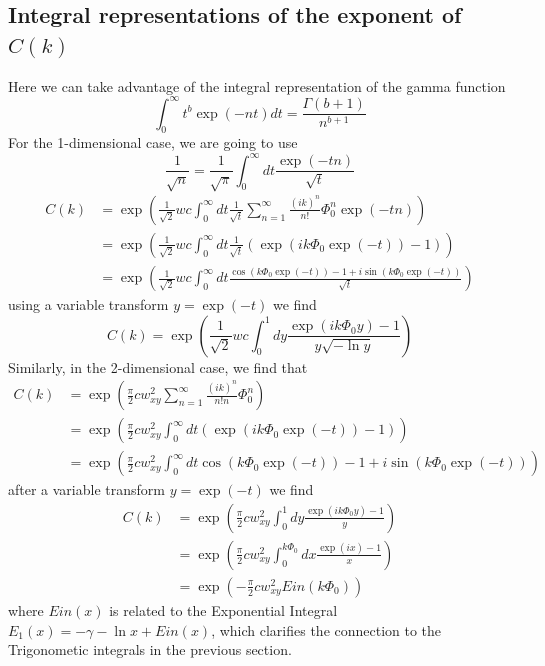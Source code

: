 \documentclass[%
 reprint,
 amsmath,amssymb,
 aps,
]{revtex4-1}
\begin{document}
\subsection{Integral representations of the exponent of $C(k)$}
Here we can take advantage of the integral representation of the gamma function
\begin{equation}
	\int_{0}^{\infty}t^{b}\exp(-nt)dt = \frac{\Gamma (b+1)}{n^{b+1}}
\end{equation}
For the 1-dimensional case, we are going to use
\begin{equation}
	\frac{1}{\sqrt{n}}=\frac{1}{\sqrt{\pi}}\int_{0}^{\infty}dt\frac{\exp(-tn)}{\sqrt{t}}
\end{equation}
\begin{equation}
	\begin{aligned}
	C(k) &= \exp\left(\frac{1}{\sqrt{2}}wc\int_{0}^{\infty}dt\frac{1}{\sqrt{t}}\sum_{n=1}^{\infty}\frac{(ik)^{n}}{n!}\Phi_{0}^{n}\exp(-tn) \right)\\
	&= \exp\left(\frac{1}{\sqrt{2}}wc\int_{0}^{\infty}dt\frac{1}{\sqrt{t}}(\exp(ik\Phi_{0}\exp(-t))-1) \right)\\
	&= \exp\left(\frac{1}{\sqrt{2}}wc\int_{0}^{\infty}dt\frac{\cos(k\Phi_{0}\exp(-t))-1+i\sin(k\Phi_{0}\exp(-t))}{\sqrt{t}} \right)
	\end{aligned}
\end{equation}
using a variable transform $y=\exp(-t)$ we find
\begin{equation}
	C(k) = \exp\left(\frac{1}{\sqrt{2}}wc\int_{0}^{1}dy\frac{\exp(ik\Phi_{0}y)-1}{y\sqrt{-\ln y}}\right)
\end{equation}
Similarly, in the 2-dimensional case, we find that
\begin{equation}
	\begin{aligned}
	C(k) &= \exp\left(\frac{\pi}{2}cw_{xy}^{2}\sum_{n=1}^{\infty}\frac{(ik)^{n}}{n!n}\Phi_{0}^{n}\right)\\
	&= \exp\left(\frac{\pi}{2}cw_{xy}^{2}\int_{0}^{\infty}dt(\exp(ik\Phi_{0}\exp(-t))-1) \right)\\
	&= \exp\left(\frac{\pi}{2}cw_{xy}^{2}\int_{0}^{\infty}dt\cos(k\Phi_{0}\exp(-t))-1+i\sin(k\Phi_{0}\exp(-t)) \right)
	\end{aligned}
\end{equation}
after a variable transform $y=\exp(-t)$ we find
\begin{equation}
	\begin{aligned}
	C(k) &= \exp\left(\frac{\pi}{2}cw_{xy}^{2}\int_{0}^{1}dy\frac{\exp(ik\Phi_{0}y)-1}{y}\right)\\
	&= \exp\left(\frac{\pi}{2}cw_{xy}^{2}\int_{0}^{k\Phi_{0}}dx\frac{\exp(ix)-1}{x}\right)\\
	&= \exp\left(-\frac{\pi}{2}cw_{xy}^{2}Ein(k\Phi_{0})\right)
	\end{aligned}
\end{equation}
where $Ein(x)$ is related to the Exponential Integral $E_{1}(x) = -\gamma -\ln x +Ein(x)$, which clarifies the connection to the Trigonometic integrals in the previous section.
\end{document}
